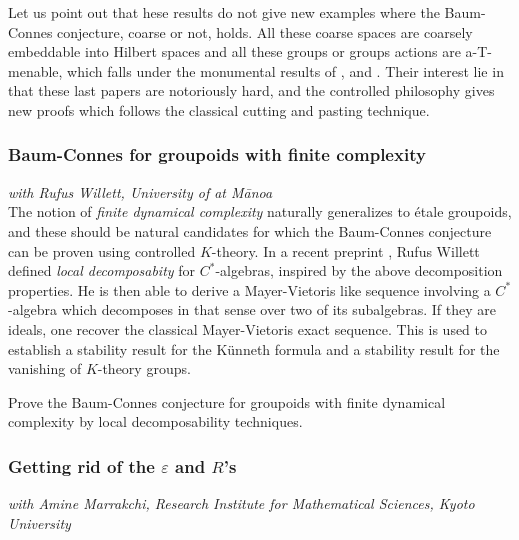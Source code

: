 Let us point out that hese results do not give new examples where the Baum-Connes conjecture, coarse or not, holds. All these coarse spaces are coarsely embeddable into Hilbert spaces and all these groups or groups actions are a-T-menable, which falls under the monumental results of \cite{HigsonKasparov}, \cite{TuThese} and \cite{Yu2}. Their interest lie in that these last papers are notoriously hard, and the controlled philosophy gives new proofs which follows the classical cutting and pasting technique.

\subsubsection*{Baum-Connes for groupoids with finite complexity}
  
\textit{with Rufus Willett, University of \Hawaii at M\={a}noa}\\

The notion of \textit{finite dynamical complexity} naturally generalizes to \'etale groupoids, and these should be natural candidates for which the Baum-Connes conjecture can be proven using controlled $K$-theory. In a recent preprint \cite{willett2019decompositions}, Rufus Willett defined \textit{local decomposabity} for $C^*$-algebras, inspired by the above decomposition properties. He is then able to derive a Mayer-Vietoris like sequence involving a $C^*$-algebra which decomposes in that sense over two of its subalgebras. If they are ideals, one recover the classical Mayer-Vietoris exact sequence. This is used to establish a stability result for the K\"unneth formula and a stability result for the vanishing of $K$-theory groups.

\begin{project}
Prove the Baum-Connes conjecture for groupoids with finite dynamical complexity by local decomposability techniques.  
\end{project} 


\subsubsection*{Getting rid of the $\varepsilon$ and $R$'s}

\textit{with Amine Marrakchi, Research Institute for Mathematical Sciences, Kyoto University}\\

